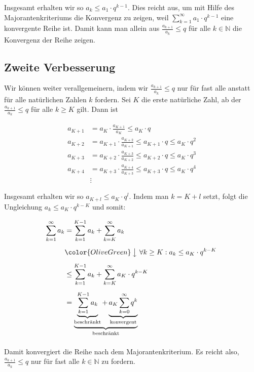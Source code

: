 \documentclass[fontsize=9pt,
               parskip=half-,
               DIV=14,
               listof=chapterentry,
               tocflat]{scrbook}
\begin{document}
Insgesamt erhalten wir so $a_{k}\leq a_{1}\cdot q^{k-1}$. Dies reicht aus, um mit Hilfe des Majorantenkriteriums die Konvergenz zu zeigen, weil $\sum _{k=1}^{\infty }a_{1}\cdot q^{k-1}$ eine konvergente Reihe ist. Damit kann man allein aus ${\frac {a_{k+1}}{a_{k}}}\leq q$ für alle $k\in \mathbb {N} $ die Konvergenz der Reihe zeigen.

\subsection{Zweite Verbesserung}

Wir können weiter verallgemeinern, indem wir ${\tfrac {a_{k+1}}{a_{k}}}\leq q$ nur für fast alle anstatt für alle natürlichen Zahlen $k$ fordern. Sei $K$ die erste natürliche Zahl, ab der ${\tfrac {a_{k+1}}{a_{k}}}\leq q$ für alle $k\geq K$ gilt. Dann ist

\begin{align*}
a_{K+1}&=a_{K}\cdot {\frac {a_{K+1}}{a_{K}}}\leq a_{K}\cdot q\\[0.5em]a_{K+2}&=a_{K+1}\cdot {\frac {a_{K+2}}{a_{K+1}}}\leq a_{K+1}\cdot q\leq a_{K}\cdot q^{2}\\[0.5em]a_{K+3}&=a_{K+2}\cdot {\frac {a_{K+3}}{a_{K+2}}}\leq a_{K+2}\cdot q\leq a_{K}\cdot q^{3}\\[0.5em]a_{K+4}&=a_{K+3}\cdot {\frac {a_{K+4}}{a_{K+3}}}\leq a_{K+3}\cdot q\leq a_{K}\cdot q^{4}\\[0.5em]&\vdots 
\end{align*}

Insgesamt erhalten wir so $a_{K+l}\leq a_{K}\cdot q^{l}$. Indem man $k=K+l$ setzt, folgt die Ungleichung $a_{k}\leq a_{K}\cdot q^{k-K}$ und somit:

\begin{align*}
\sum _{k=1}^{\infty }a_{k}&=\sum _{k=1}^{K-1}a_{k}+\sum _{k=K}^{\infty }a_{k}\\[0.5em]&{\color {OliveGreen}\left\downarrow \ \forall k\geq K:a_{k}\leq a_{K}\cdot q^{k-K}\right.}\\[0.5em]&\leq \sum _{k=1}^{K-1}a_{k}+\sum _{k=K}^{\infty }a_{K}\cdot q^{k-K}\\[0.5em]&=\underbrace {\underbrace {\sum _{k=1}^{K-1}a_{k}} _{\text{beschränkt}}+\underbrace {a_{K}\sum _{k=0}^{\infty }q^{k}} _{\text{konvergent}}} _{\text{beschränkt}}\\[0.5em]
\end{align*}

Damit konvergiert die Reihe nach dem Majorantenkriterium. Es reicht also, ${\tfrac {a_{k+1}}{a_{k}}}\leq q$ nur für fast alle $k\in \mathbb {N} $ zu fordern.
\end{document}
